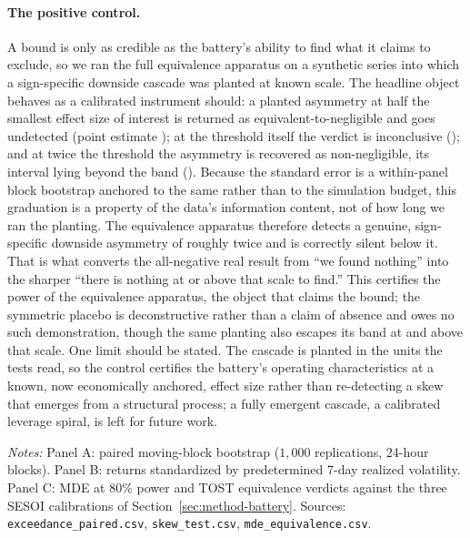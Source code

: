 \paragraph{The positive control.}
A bound is only as credible as the battery's ability to find what it
claims to exclude, so we ran the full equivalence apparatus on a synthetic
series into which a sign-specific downside cascade was planted at known
scale. The headline object behaves as a calibrated instrument
should: a planted asymmetry at half the smallest effect size of interest
is returned as equivalent-to-negligible and goes undetected (point
estimate \PosCtrlDeltaHalf{}); at the threshold itself the verdict is
inconclusive (\PosCtrlDeltaOne{}); and at twice the threshold the
asymmetry is recovered as non-negligible, its interval lying beyond the
band (\PosCtrlDeltaTwo{}). Because the standard error is a within-panel
block bootstrap anchored to the same \MdeEightyExc{} rather than to the
simulation budget, this graduation is a property of the data's information
content, not of how long we ran the planting. The equivalence apparatus
therefore detects a genuine, sign-specific downside asymmetry of
roughly twice \SesoiStrict{} and is correctly silent below it. That is
what converts the all-negative real result from ``we found nothing'' into
the sharper ``there is nothing at or above that scale to find.'' This certifies
the power of the equivalence apparatus, the object that claims the bound; the
symmetric placebo is deconstructive rather than a claim of absence and owes
no such demonstration, though the same planting also escapes its band at and
above that scale. One limit should
be stated. The cascade is planted in the units the tests read, so the
control certifies the battery's operating characteristics at a known,
now economically anchored, effect size rather than re-detecting a skew that
emerges from a structural process; a fully emergent cascade, a calibrated
leverage spiral, is left for future work.

\begin{table}[t]
\centering
\caption{Paired asymmetry, standardized skew, and equivalence verdicts.}
\label{tab:nullbound}

\begin{minipage}{0.92\textwidth}
\vspace{2pt}
{\scriptsize \emph{Notes:} Panel A: paired moving-block bootstrap
($1{,}000$ replications, 24-hour blocks). Panel B: returns standardized by
predetermined 7-day realized volatility. Panel C: MDE at 80\% power and
TOST equivalence verdicts against the three SESOI calibrations of
Section~\ref{sec:method-battery}. Sources: \texttt{exceedance\_paired.csv},
\texttt{skew\_test.csv}, \texttt{mde\_equivalence.csv}.}
\end{minipage}
\end{table}


